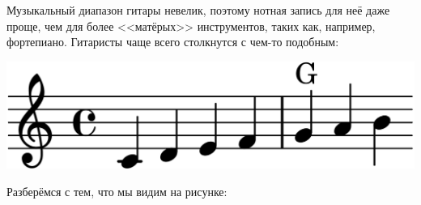 Музыкальный диапазон гитары невелик, поэтому нотная запись для неё даже проще, чем для более <<матёрых>> инструментов, таких как, например, фортепиано. Гитаристы чаще всего столкнутся с чем-то подобным:

\begin{center}    
    \includegraphics{fig/notes/octave-little}
\end{center}    

Разберёмся с тем, что мы видим на рисунке:
